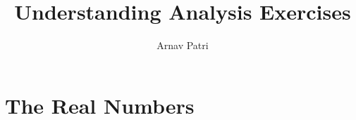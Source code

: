 \documentclass[12pt, A4]{report}
\author{Arnav Patri}
\title{Understanding Analysis Exercises}
\begin{document}
	\maketitle
	\tableofcontents
		\chapter{The Real Numbers}
			
\end{document}
